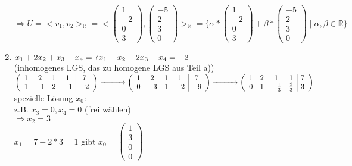 \documentclass[a4paper,11pt]{article}
\begin{document}
\begin{enumerate}[label=\alph*)]
$\Rightarrow U=<v_1,v_2>_{\mathbb{R}}=<\begin{pmatrix}1\\-2\\0\\3\end{pmatrix}, \begin{pmatrix}-5\\2\\3\\0\end{pmatrix}>_{\mathbb{R}}=\{\alpha*\begin{pmatrix}1\\-2\\0\\3\end{pmatrix}+\beta*\begin{pmatrix}-5\\2\\3\\0\end{pmatrix}\mid\alpha,\beta\in\mathbb{R}\}$ 
\item $x_1+2x_2+x_3+x_4=7 \\
x_1-x_2-2x_3-x_4=-2$ \\
(inhomogenes LGS, das zu homogene LGS aus Teil a)) \\
$\left(\begin{array}{cccc|c}1&2&1&1&7\\1&-1&2&-1&-2\end{array}\right)\overset{}{\xrightarrow{\hspace*{1cm}}}\left(\begin{array}{cccc|c}1&2&1&1&7\\0&-3&1&-2&-9\end{array}\right)\overset{}{\xrightarrow{\hspace*{1cm}}}\left(\begin{array}{cccc|c}1&2&1&1&7\\0&1&-\frac{1}{3}&\frac{2}{3}&3\end{array}\right)$ \\
spezielle Lösung $x_0$: \\
z.B. $x_3=0,x_4=0$ (frei wählen) \\
$\Rightarrow x_2=3$ \\
$x_1=7-2*3=1$ gibt $x_0=\begin{pmatrix}1\\3\\0\\0\end{pmatrix}$ \\

\end{enumerate}
\end{document}
